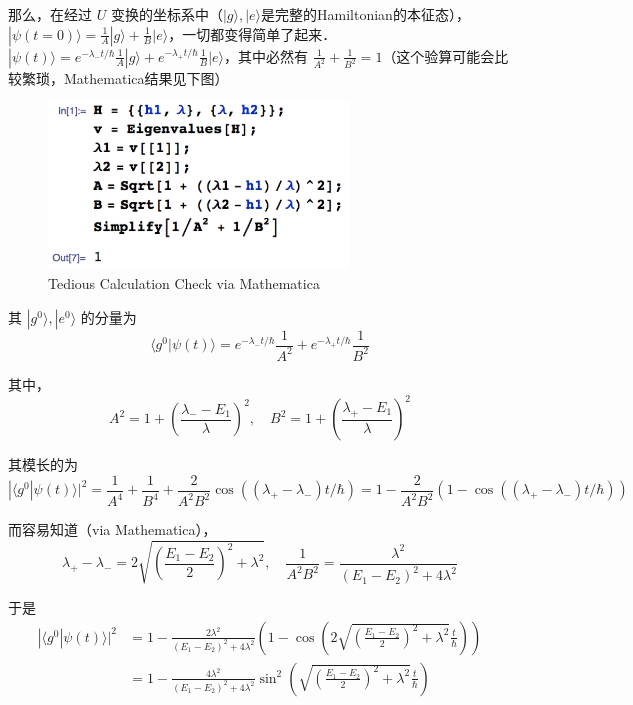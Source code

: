 那么，在经过 $U$ 变换的坐标系中（$|g\rangle,|e\rangle$是完整的Hamiltonian的本征态），$|\psi(t=0)\rangle = \frac{1}{A}|g\rangle + \frac{1}{B}|e\rangle$，一切都变得简单了起来． $|\psi(t)\rangle = e^{-\lambda_-t/\hbar}\frac{1}{A}|g\rangle + e^{-\lambda_+t/\hbar}\frac{1}{B}|e\rangle$，其中必然有 $\frac{1}{A^2} + \frac{1}{B^2} = 1$（这个验算可能会比较繁琐，Mathematica结果见下图）
\begin{figure}[ht]
\centering
\includegraphics[width=8cm]{./figures/AprPtr1.pdf}
\caption{Tedious Calculation Check via Mathematica} \label{AprPtr_fig1}
\end{figure}

其 $|g^0\rangle,|e^0\rangle$ 的分量为
\begin{equation}
\langle g^0|\psi(t)\rangle = e^{-\lambda_-t/\hbar}\frac{1}{A^2} + e^{-\lambda_+t/\hbar}\frac{1}{B^2}
\end{equation}

其中，
\begin{equation}
A^2 = 1 + \left(\frac{\lambda_- - E_1}{\lambda}\right)^2 ,\quad B^2 = 1 + \left(\frac{\lambda_+ - E_1}{\lambda}\right)^2
\end{equation}

其模长的为
\begin{equation}
|\langle g^0|\psi(t)\rangle|^2 = \frac{1}{A^4}+\frac{1}{B^4} + \frac{2}{A^2B^2}\cos((\lambda_+-\lambda_-) t/\hbar) = 1 - \frac{2}{A^2B^2}(1-\cos((\lambda_+-\lambda_-) t/\hbar))
\end{equation}

而容易知道（via Mathematica），
\begin{equation}
\lambda_+-\lambda_- = 2\sqrt{\left( \frac{E_1-E_2}{2}\right)^2 + \lambda^2},\quad \frac{1}{A^2B^2} = \frac{\lambda^2}{(E_1-E_2)^2+4\lambda^2}
\end{equation}

于是
\begin{equation}
\begin{split}
|\langle g^0|\psi(t)\rangle|^2 &= 1 - \frac{2\lambda^2}{(E_1-E_2)^2+4\lambda^2}\left(1-\cos\left(2\sqrt{\left( \frac{E_1-E_2}{2}\right)^2 + \lambda^2}\frac{t}{\hbar}\right)\right) \\
&= 1 - \frac{4\lambda^2}{(E_1-E_2)^2+4\lambda^2}\sin^2\left(\sqrt{\left( \frac{E_1-E_2}{2}\right)^2 + \lambda^2}\frac{t}{\hbar}\right)
\end{split}
\end{equation}

